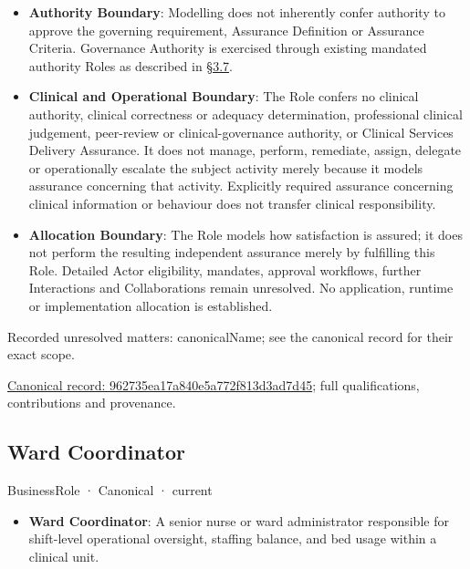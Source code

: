 \begin{itemize}
\item \textbf{Authority Boundary}: Modelling does not inherently confer authority to approve the governing requirement, Assurance Definition or Assurance Criteria. Governance Authority is exercised through existing mandated authority Roles as described in \href{\detokenize{../../../../../docs/markdown/03-business-architecture/actors-roles/roles.md#37-governance-authority-and-assurance-modelling}}{§3.7}.

\item \textbf{Clinical and Operational Boundary}: The Role confers no clinical authority, clinical correctness or adequacy determination, professional clinical judgement, peer-review or clinical-governance authority, or Clinical Services Delivery Assurance. It does not manage, perform, remediate, assign, delegate or operationally escalate the subject activity merely because it models assurance concerning that activity. Explicitly required assurance concerning clinical information or behaviour does not transfer clinical responsibility.

\item \textbf{Allocation Boundary}: The Role models how satisfaction is assured; it does not perform the resulting independent assurance merely by fulfilling this Role. Detailed Actor eligibility, mandates, approval workflows, further Interactions and Collaborations remain unresolved. No application, runtime or implementation allocation is established.

\end{itemize}





{\small Recorded unresolved matters: canonicalName; see the canonical record for their exact scope.}\par
{\footnotesize \href{../../../../continuum/business/business-role/962735ea17a840e5a772f813d3ad7d45.md}{Canonical record: 962735ea17a840e5a772f813d3ad7d45}; full qualifications, contributions and provenance.}\par
\subsection{Ward Coordinator}

\label{element:9b4ea5f137c9474db1c9dc5ac57a1207}
{\small BusinessRole · Canonical · current}\par

\begin{itemize}


\item \textbf{Ward Coordinator}: A senior nurse or ward administrator responsible for shift-level operational oversight, staffing balance, and bed usage within a clinical unit.

\end{itemize}

